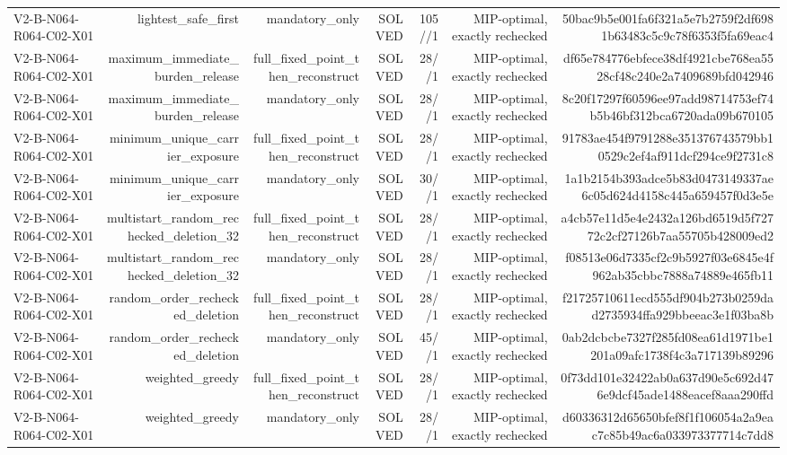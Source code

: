 {\begin{longtable}{lrrrrrr}
V2-B-N064-R064-C02-X01 & lightest\_safe\_first & mandatory\_only & SOLVED & 105//1 & MIP-optimal, exactly rechecked & 50bac9b5e001fa6f321a5e7b2759f2df6981b63483c5c9c78f6353f5fa69eac4 \\
V2-B-N064-R064-C02-X01 & maximum\_immediate\_burden\_release & full\_fixed\_point\_then\_reconstruct & SOLVED & 28//1 & MIP-optimal, exactly rechecked & df65e784776ebfece38df4921cbe768ea5528cf48c240e2a7409689bfd042946 \\
V2-B-N064-R064-C02-X01 & maximum\_immediate\_burden\_release & mandatory\_only & SOLVED & 28//1 & MIP-optimal, exactly rechecked & 8c20f17297f60596ee97add98714753ef74b5b46bf312bca6720ada09b670105 \\
V2-B-N064-R064-C02-X01 & minimum\_unique\_carrier\_exposure & full\_fixed\_point\_then\_reconstruct & SOLVED & 28//1 & MIP-optimal, exactly rechecked & 91783ae454f9791288e351376743579bb10529c2ef4af911dcf294ce9f2731c8 \\
V2-B-N064-R064-C02-X01 & minimum\_unique\_carrier\_exposure & mandatory\_only & SOLVED & 30//1 & MIP-optimal, exactly rechecked & 1a1b2154b393adce5b83d0473149337ae6c05d624d4158c445a659457f0d3e5e \\
V2-B-N064-R064-C02-X01 & multistart\_random\_rechecked\_deletion\_32 & full\_fixed\_point\_then\_reconstruct & SOLVED & 28//1 & MIP-optimal, exactly rechecked & a4cb57e11d5e4e2432a126bd6519d5f72772c2cf27126b7aa55705b428009ed2 \\
V2-B-N064-R064-C02-X01 & multistart\_random\_rechecked\_deletion\_32 & mandatory\_only & SOLVED & 28//1 & MIP-optimal, exactly rechecked & f08513e06d7335cf2c9b5927f03e6845e4f962ab35cbbc7888a74889e465fb11 \\
V2-B-N064-R064-C02-X01 & random\_order\_rechecked\_deletion & full\_fixed\_point\_then\_reconstruct & SOLVED & 28//1 & MIP-optimal, exactly rechecked & f21725710611ecd555df904b273b0259dad2735934ffa929bbeeac3e1f03ba8b \\
V2-B-N064-R064-C02-X01 & random\_order\_rechecked\_deletion & mandatory\_only & SOLVED & 45//1 & MIP-optimal, exactly rechecked & 0ab2dcbcbe7327f285fd08ea61d1971be1201a09afc1738f4c3a717139b89296 \\
V2-B-N064-R064-C02-X01 & weighted\_greedy & full\_fixed\_point\_then\_reconstruct & SOLVED & 28//1 & MIP-optimal, exactly rechecked & 0f73dd101e32422ab0a637d90e5c692d476e9dcf45ade1488eacef8aaa290ffd \\
V2-B-N064-R064-C02-X01 & weighted\_greedy & mandatory\_only & SOLVED & 28//1 & MIP-optimal, exactly rechecked & d60336312d65650bfef8f1f106054a2a9eac7c85b49ac6a033973377714c7dd8 \\

\end{longtable}}
